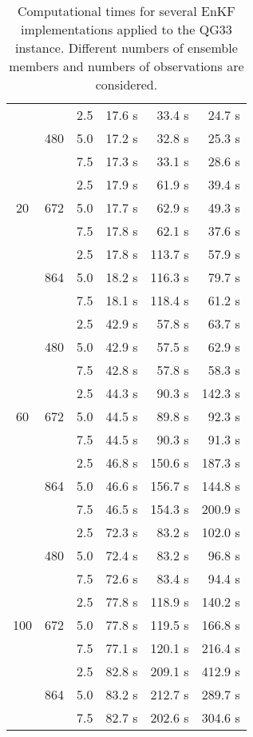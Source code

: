 \documentclass[12pt]{article}
\begin{document}
\begin{table}[H]
\centering
{\footnotesize
\begin{tabular}{|c|c|c|r|r|r|} \hline
 &  &  &  &  &  \\ \hline
\multirow{9}{*}{20} &  \multirow{3}{*}{480}  & 2.5 & 17.6 s & 33.4 s & 24.7 s\\
& & 5.0 & 17.2 s & 32.8 s & 25.3 s \\ 
& & 7.5 & 17.3 s & 33.1 s & 28.6 s  \\ 
\cline{2-6}
&  \multirow{3}{*}{672}  & 2.5 & 17.9 s & 61.9 s & 39.4 s \\
& & 5.0 & 17.7 s & 62.9 s & 49.3 s \\ 
& & 7.5 & 17.8 s & 62.1 s & 37.6 s \\ 
\cline{2-6}
&  \multirow{3}{*}{864}  & 2.5 & 17.8 s & 113.7 s & 57.9 s \\
& & 5.0 & 18.2 s & 116.3 s & 79.7 s \\ 
& & 7.5 & 18.1 s & 118.4 s & 61.2 s \\ 
\cline{1-6}
\multirow{9}{*}{60} &  \multirow{3}{*}{480}  & 2.5 & 42.9 s & 57.8 s & 63.7 s \\
& & 5.0 & 42.9 s & 57.5 s & 62.9 s \\ 
& & 7.5 & 42.8 s & 57.8 s & 58.3 s \\ 
\cline{2-6}
&  \multirow{3}{*}{672}  & 2.5 & 44.3 s & 90.3 s & 142.3 s\\
& & 5.0 & 44.5 s & 89.8 s & 92.3 s \\ 
& & 7.5 & 44.5 s & 90.3 s & 91.3 s \\ 
\cline{2-6}
&  \multirow{3}{*}{864}  & 2.5 & 46.8 s & 150.6 s & 187.3 s \\
& & 5.0 & 46.6 s & 156.7 s & 144.8 s \\ 
& & 7.5 & 46.5 s & 154.3 s & 200.9 s \\ 
\cline{1-6}
\multirow{9}{*}{100} &  \multirow{3}{*}{480}  & 2.5 & 72.3 s & 83.2 s & 102.0 s \\
& & 5.0 & 72.4 s & 83.2 s & 96.8 s \\ 
& & 7.5 & 72.6 s & 83.4 s & 94.4 s \\ 
\cline{2-6}
&  \multirow{3}{*}{672}  & 2.5 & 77.8 s & 118.9 s & 140.2 s \\
& & 5.0 & 77.8 s & 119.5 s & 166.8 s \\ 
& & 7.5 & 77.1 s & 120.1 s & 216.4 s \\ 
\cline{2-6}
&  \multirow{3}{*}{864}  & 2.5 & 82.8 s & 209.1 s & 412.9 s \\
& & 5.0 & 83.2 s & 212.7 s & 289.7 s \\ 
& & 7.5 & 82.7 s & 202.6 s & 304.6 s \\ 
\hline
\end{tabular}
}
\caption{Computational times for several EnKF implementations applied to the QG33 instance.
Different numbers of ensemble members and numbers of observations are considered.}
\label{Tab:QG33-Results-ElapsedTime}
\end{table}
\end{document}
